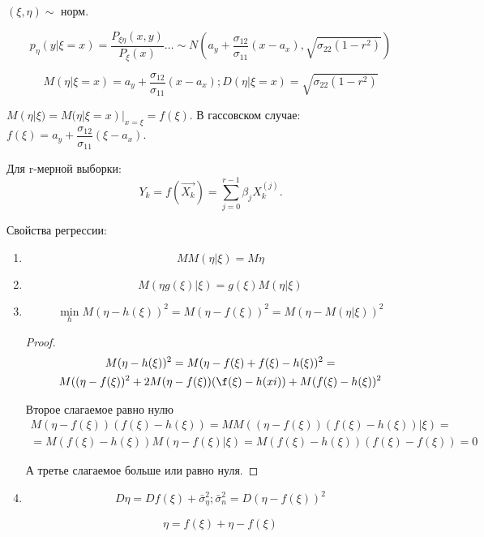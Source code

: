 \begin{ex}
  $(\xi, \eta) \sim$ норм.

  \[
    p_\eta (y | \xi=x) = \dfrac{P_{\xi\eta} (x, y)}{P_\xi(x)} \dots \sim N\left(a_y+\dfrac{\sigma_{12}}{\sigma_{11}}(x-a_x), \sqrt{\sigma_{22} (1-r^2)}\right)
  \]

  \[
    M(\eta | \xi=x) = a_y + \dfrac{\sigma_{12}}{\sigma_{11}} (x-a_x);
    D(\eta | \xi=x) = \sqrt{\sigma_{22} (1-r^2) }
  \]

  $M(\eta | \xi) = M(\eta | \xi=x) |_{x=\xi} = f(\xi)$.
  В гассовском случае:
  $f(\xi) = a_y + \dfrac{\sigma_{12}}{\sigma_{11}} (\xi - a_x)$.

  Для r-мерной выборки:
  \[
    Y_k = f(\vec{X_k}) = \sum_{j=0}^{r-1} \beta_j X_k^{(j)}.
  \]
\end{ex}

Свойства регрессии:
\begin{enumerate}
  \item
    \[
      M M(\eta | \xi) = M \eta
    \]
  \item
    \[
      M (\eta g(\xi) | \xi) = g(\xi) M(\eta | \xi)
    \]
  \item
    \[
      \min_{h} M(\eta - h(\xi))^2 = M (\eta - f(\xi))^2 = M (\eta - M(\eta | \xi))^2
    \]
    \begin{proof}
      \begin{multline*}
        M(\eta - h(\xi))^2 = M( \eta - f(\xi) + f(\xi) - h(\xi) )^2 = \\
        M( (\eta - f(\xi))^2 + 2 M(\eta - f(\xi))(\f(\xi) - h(xi)) + M (f(\xi) - h(\xi))^2 
      \end{multline*}

      Второе слагаемое равно нулю
      \begin{multline*}
        M(\eta - f(\xi))(f(\xi) - h(\xi)) = M M( (\eta - f(\xi))(f(\xi) - h(\xi)) |\xi ) = \\
        = M( f(\xi) - h(\xi) ) M(\eta - f(\xi) | \xi) 
        = M( f(\xi) - h(\xi) ) (f(\xi) - f(\xi)) = 0
      \end{multline*}

      А третье слагаемое больше или равно нуля.
    \end{proof}

  \item
    \[
      D \eta = D f(\xi) + \bar \sigma_\eta^2; \bar \sigma_n^2 = D(\eta - f(\xi))^2
    \]

    \[
      \eta = f(\xi) + \eta - f(\xi)
    \]
\end{enumerate}
